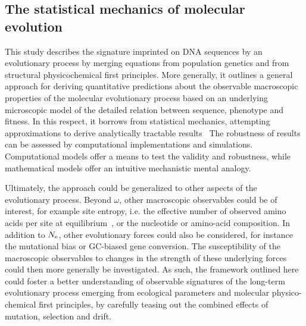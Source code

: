\documentclass[authoryear]{elsarticle} %
\begin{document}
\subsection{The statistical mechanics of molecular evolution}

This study describes the signature imprinted on DNA sequences by an evolutionary process by merging equations from population genetics and from structural physicochemical first principles.
More generally, it outlines a general approach for deriving quantitative predictions about the observable macroscopic properties of the molecular evolutionary process based on an underlying microscopic model of the detailed relation between sequence, phenotype and fitness.
In this respect, it borrows from statistical mechanics, attempting approximations to derive analytically tractable results~\citep{Sella2005, Mustonen2009, Bastolla2012, Bastolla2017}
The robustness of results can be assessed by computational implementations and simulations.
Computational models offer a means to test the validity and robustness, while mathematical models offer an intuitive mechanistic mental analogy.

Ultimately, the approach could be generalized to other aspects of the evolutionary process.
Beyond $\omega$, other macroscopic observables could be of interest, for example site entropy, i.e. the effective number of observed amino acids per site at equilibrium~\citep{Goldstein2016, Jimenez2018, Jiang2018}, or the nucleotide or amino-acid composition.
In addition to $N_{\text{e}}$, other evolutionary forces could also be considered, for instance the mutational bias or GC-biased gene conversion.
The susceptibility of the macroscopic observables to changes in the strength of these underlying forces could then more generally be investigated.
As such, the framework outlined here could foster a better understanding of observable signatures of the long-term evolutionary process emerging from ecological parameters and molecular physico-chemical first principles, by carefully teasing out the combined effects of mutation, selection and drift.
\end{document}
